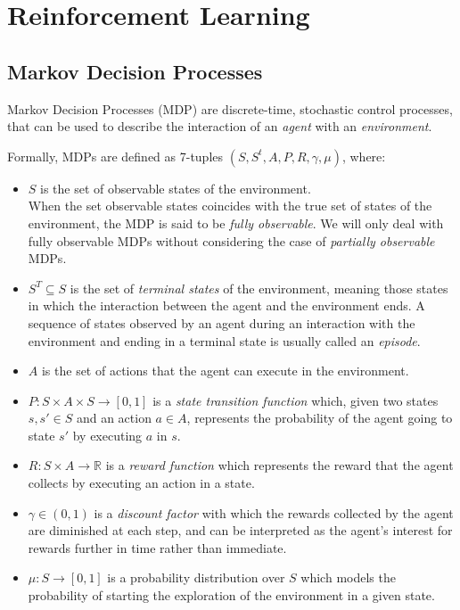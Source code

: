 \section{Reinforcement Learning}

\subsection{Markov Decision Processes}
Markov Decision Processes (MDP) are discrete-time, stochastic control 
processes, that can be used to describe the interaction of an \textit{agent} 
with an \textit{environment}.

Formally, MDPs are defined as 7-tuples $(S, S^{t}, A, P, R, \gamma, \mu)$, 
where:
\begin{itemize}
    \item $S$ is the set of observable states of the environment. \\
    When the set observable states coincides with the true set of states of the 
    environment, the MDP is said to be \textit{fully observable}. We will only deal 
    with fully observable MDPs without considering the case of \textit{partially 
    observable} MDPs.

    \item $S^{T} \subseteq S$ is the set of \textit{terminal states} of the 
    environment, meaning those states in which the interaction between the agent and 
    the environment ends. A sequence of states observed by an agent during an 
    interaction with the environment and ending in a terminal state is usually 
    called an \textit{episode}.
 
    \item $A$ is the set of actions that the agent can execute in the environment.
 
    \item $P: S \times A \times S \rightarrow [0,1]$ is a \textit{state transition 
    function} which, given two states $s, s' \in S$ and an action $a \in A$, 
    represents the probability of the agent going to state $s'$ by executing $a$ in 
    $s$.
 
    \item $R: S \times A \rightarrow \mathbb{R}$ is a \textit{reward function} 
    which represents the reward that the agent collects by executing an action in 
    a state. 
    
    \item $\gamma \in (0,1)$ is a \textit{discount factor} with which the rewards 
    collected by the agent are diminished at each step, and can be interpreted as 
    the agent's interest for rewards further in time rather than immediate.
    
    \item $\mu: S \rightarrow [0, 1]$ is a probability distribution over $S$ which 
    models the probability of starting the exploration of the environment in a 
    given state.
\end{itemize}

